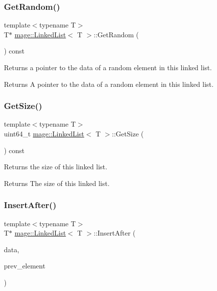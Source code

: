 \subsubsection{\texorpdfstring{Get\+Random()}{GetRandom()}}
{\footnotesize\ttfamily template$<$typename T$>$ \\
T$\ast$ \hyperlink{classmage_1_1_linked_list}{mage\+::\+Linked\+List}$<$ T $>$\+::Get\+Random (\begin{DoxyParamCaption}{ }\end{DoxyParamCaption}) const}

Returns a pointer to the data of a random element in this linked list.

\begin{DoxyReturn}{Returns}
A pointer to the data of a random element in this linked list. 
\end{DoxyReturn}
\hypertarget{classmage_1_1_linked_list_a8d033278680a0053e30cba91b27941a1}{}\label{classmage_1_1_linked_list_a8d033278680a0053e30cba91b27941a1} 
\subsubsection{\texorpdfstring{Get\+Size()}{GetSize()}}
{\footnotesize\ttfamily template$<$typename T$>$ \\
uint64\+\_\+t \hyperlink{classmage_1_1_linked_list}{mage\+::\+Linked\+List}$<$ T $>$\+::Get\+Size (\begin{DoxyParamCaption}{ }\end{DoxyParamCaption}) const}

Returns the size of this linked list.

\begin{DoxyReturn}{Returns}
The size of this linked list. 
\end{DoxyReturn}
\hypertarget{classmage_1_1_linked_list_a25424001f549e03d785a219d99231044}{}\label{classmage_1_1_linked_list_a25424001f549e03d785a219d99231044} 
\subsubsection{\texorpdfstring{Insert\+After()}{InsertAfter()}}
{\footnotesize\ttfamily template$<$typename T$>$ \\
T$\ast$ \hyperlink{classmage_1_1_linked_list}{mage\+::\+Linked\+List}$<$ T $>$\+::Insert\+After (\begin{DoxyParamCaption}\item[{T $\ast$}]{data,  }\item[{\hyperlink{structmage_1_1_linked_list_1_1_linked_list_element}{Linked\+List\+Element} $\ast$}]{prev\+\_\+element }\end{DoxyParamCaption})}

